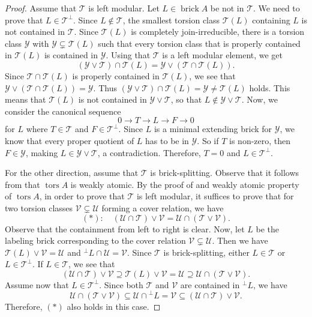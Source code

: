 \documentclass{amsart}
\theoremstyle{thmstyle}
\theoremstyle{exstyle}
\theoremstyle{defstyle}
\theoremstyle{remstyle}
\theoremstyle{remstyle}
\DeclareMathOperator*{\brick}{brick}
\DeclareMathOperator*{\tors}{tors}
\begin{document}
\begin{proof}
Assume that $\mathcal{T}$ is left modular. Let $L \in \brick A$ be not in $\mathcal{T}$. We need to prove that $L \in \mathcal{T}^\perp$. Since $L \not \in \mathcal{T}$, the smallest torsion class $\mathcal{T}(L)$ containing $L$ is not contained in $\mathcal{T}$. Since $\mathcal{T}(L)$ is completely join-irreducible, there is a torsion class $\mathcal{Y}$ with $\mathcal{Y} \subsetneq \mathcal{T}(L)$ such that every torsion class that is properly contained in $\mathcal{T}(L)$ is contained in $\mathcal{Y}$. Using that $\mathcal{T}$ is a left modular element, we get
$$(\mathcal{Y} \vee \mathcal{T}) \cap \mathcal{T}(L) = \mathcal{Y} \vee (\mathcal{T} \cap \mathcal{T}(L)).$$
Since $\mathcal{T} \cap \mathcal{T}(L)$ is properly contained in $\mathcal{T}(L)$, we see that $ \mathcal{Y} \vee (\mathcal{T} \cap \mathcal{T}(L)) = \mathcal{Y}$. Thus $(\mathcal{Y} \vee \mathcal{T}) \cap \mathcal{T}(L)=\mathcal{Y} \neq \mathcal{T}(L)$ holds. This means that $\mathcal{T}(L)$ is not contained in $\mathcal{Y} \vee \mathcal{T}$, so that $L \not \in \mathcal{Y} \vee \mathcal{T}.$ Now, we consider the canonical sequence
$$0 \to T \to L \to F \to 0$$
for $L$ where $T \in \mathcal{T}$ and $F \in \mathcal{T}^\perp$. Since $L$ is a minimal extending brick for $\mathcal{Y}$, we know that every proper quotient of $L$ has to be in $\mathcal{Y}$. So if $T$ is non-zero, then $F \in \mathcal{Y}$, making $L \in \mathcal{Y} \vee \mathcal{T}$, a contradiction. Therefore, $T=0$ and $L \in \mathcal{T}^\perp$.

For the other direction, assume that $\mathcal{T}$ is brick-splitting. Observe that it follows from \cite[Theorem 1.3]{DI+} that $\tors A$ is weakly atomic. By the proof of \cite[Lemma 2.8]{TW} and weakly atomic property of $\tors A$, in order to prove that $\mathcal{T}$ is left modular, it suffices to prove that for two torsion classes $\mathcal{V} \subsetneq \mathcal{U}$ forming a cover relation, we have 
$$(*):\quad (\mathcal{U}\cap \mathcal{T}) \vee \mathcal{V} = \mathcal{U} \cap (\mathcal{T} \vee \mathcal{V}).$$
Observe that the containment from left to right is clear. Now, let $L$ be the labeling brick corresponding to the cover relation $\mathcal{V} \subsetneq \mathcal{U}$. Then we have $\mathcal{T}(L)\vee\mathcal{V}=\mathcal{U}$ and ${}^\perp L\cap\mathcal{U}=\mathcal{V}$. Since $\mathcal{T}$ is brick-splitting, either $L \in \mathcal{T}$ or $L \in \mathcal{T}^\perp$. If $L \in \mathcal{T}$, we see that
$$(\mathcal{U} \cap \mathcal{T})\vee\mathcal{V} \supseteq \mathcal{T}(L) \vee \mathcal{V}= \mathcal{U} \supseteq \mathcal{U} \cap (\mathcal{T} \vee \mathcal{V}).$$
Assume now that $L \in \mathcal{T}^\perp$. 
Since both $\mathcal{T}$ and $\mathcal{V}$ are contained in $^\perp L$, we have
$$\mathcal{U} \cap (\mathcal{T} \vee \mathcal{V}) \subseteq \mathcal{U} \cap {^\perp L} = \mathcal{V}\subseteq(\mathcal{U}\cap \mathcal{T}) \vee \mathcal{V}.$$
Therefore, $(*)$ also holds in this case.
\end{proof}
\end{document}

